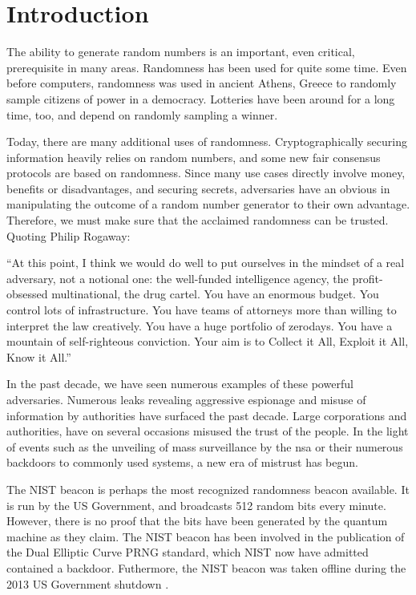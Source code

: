 \section{Introduction}\label{cha:introduction}

The ability to generate random numbers is an important, even critical, prerequisite in many areas. Randomness has been used for quite some time. Even before computers, randomness was used in ancient Athens, Greece to randomly sample citizens of power in a democracy. Lotteries have been around for a long time, too, and depend on randomly sampling a winner.

Today, there are many additional uses of randomness. Cryptographically securing information heavily relies on random numbers, and some new fair consensus protocols are based on randomness. Since many use cases directly involve money, benefits or disadvantages, and securing secrets, adversaries have an obvious in manipulating the outcome of a random number generator to their own advantage. Therefore, we must make sure that the acclaimed randomness can be trusted.
Quoting Philip Rogaway:
\begin{displayquote}
    ``At this point, I think we would do well to put ourselves in the mindset of a real adversary, not a notional one: the well-funded intelligence agency, the profit-obsessed multinational, the drug cartel. You have an enormous budget. You control lots of infrastructure. You have teams of attorneys more than willing to interpret the law creatively. You have a huge portfolio of zerodays. You have a mountain of self-righteous conviction. Your aim is to Collect it All, Exploit it All, Know it All.''
\end{displayquote}

In the past decade, we have seen numerous examples of these powerful adversaries.
Numerous leaks revealing aggressive espionage and misuse of information by authorities have surfaced the past decade.
Large corporations and authorities, have on several occasions misused the trust of the people.
In the light of events such as the unveiling of mass surveillance by the \gls{nsa} or their numerous backdoors to commonly used systems, a new era of mistrust has begun.

The NIST beacon is perhaps the most recognized randomness beacon available. It is run by the US Government, and broadcasts 512 random bits every minute. However, there is no proof that the bits have been generated by the quantum machine as they claim. The NIST beacon has been involved in the publication of the Dual Elliptic Curve PRNG standard, which NIST now have admitted contained a backdoor. Futhermore, the NIST beacon was taken offline during the 2013 US Government shutdown .

